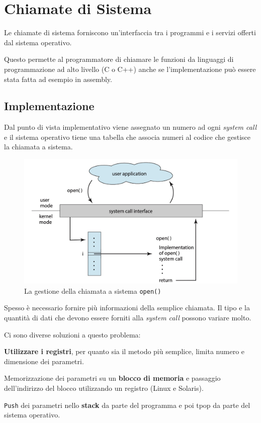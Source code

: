 \section{Chiamate di Sistema}
Le chiamate di sistema forniscono un'interfaccia tra i programmi e i servizi offerti dal sistema operativo.

Questo permette al programmatore di chiamare le funzioni da linguaggi di programmazione ad alto livello (C o C++) anche se l'implementazione può essere stata fatta ad esempio in assembly.

\subsection{Implementazione}
Dal punto di vista implementativo viene assegnato un numero ad ogni \textit{system call} e il sistema operativo tiene una tabella che associa numeri al codice che gestisce la chiamata a sistema.

\begin{figure}[H]
    \centering
    \includegraphics[width=0.65\linewidth]{assets/systemcall.jpg}
    \caption{La gestione della chiamata a sistema \texttt{open()}}
\end{figure}

Spesso è necessario fornire più informazioni della semplice chiamata. Il tipo e la quantità di dati che devono essere forniti alla \textit{system call} possono variare molto.

\spacer
Ci sono diverse soluzioni a questo problema:
\begin{sitemize}
    \item \textbf{Utilizzare i registri}, per quanto sia il metodo più semplice, limita numero e dimensione dei parametri.
    \item Memorizzazione dei parametri su un \textbf{blocco di memoria} e passaggio dell'indirizzo del blocco utilizzando un registro (Linux e Solaris).
    \item \texttt{Push} dei parametri nello \textbf{stack} da parte del programma e poi \textit{}t{pop} da parte del sistema operativo.
\end{sitemize}

